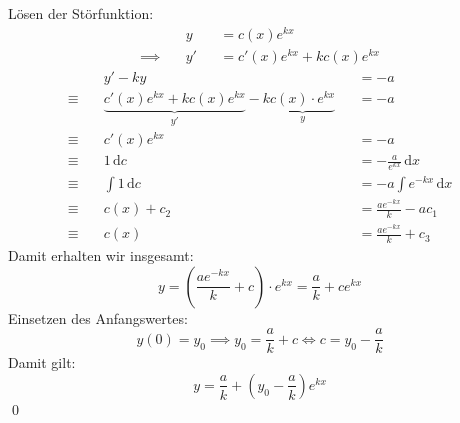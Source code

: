 \documentclass[answers]{exam}
\renewcommand{\d}{\,\mathrm{d}}
\begin{document}
\begin{questions}
\begin{solution}
        Lösen der Störfunktion:
        $$
            \begin{aligned}
                               & y  &  & = c(x)e^{kx}                \\
                \implies \quad & y' &  & = c'(x)e^{kx} + kc(x)e^{kx}
            \end{aligned}
        $$
        $$
            \begin{aligned}
                             & y' - ky                                                                           &  & = - a                       \\
                \equiv \quad & \underbrace{c'(x) e^{kx} + kc(x)e^{kx}}_{y'} - k\underbrace{c(x) \cdot e^{kx} }_y &  & = - a                       \\
                \equiv \quad & c'(x)e^{kx}                                                                       &  & = - a                       \\
                \equiv \quad & 1 \d c                                                                            &  & = -\frac{a}{e^{kx}} \d x    \\
                \equiv \quad & \int  1 \d c                                                                      &  & = -a \int e^{-kx} \d x      \\
                \equiv \quad & c(x) + c_2                                                                        &  & = \frac{ae^{-kx}}{k} - ac_1 \\
                \equiv \quad & c(x)                                                                              &  & = \frac{ae^{-kx}}{k} + c_3
            \end{aligned}
        $$
        Damit erhalten wir insgesamt:
        $$
            y = \left(\frac{ae^{-kx}}{k} + c\right) \cdot e^{kx} = \frac{a}{k} + ce^{kx}
        $$
        Einsetzen des Anfangswertes:
        $$
            y(0) = y_0 \implies y_0 = \frac{a}{k} + c \iff c = y_0 - \frac{a}{k}
        $$
        Damit gilt:
        $$
            y = \frac{a}{k} + \left(y_0 - \frac{a}{k}\right)e^{kx}
        $$\qed
    \end{solution}
\end{questions}
\end{document}
